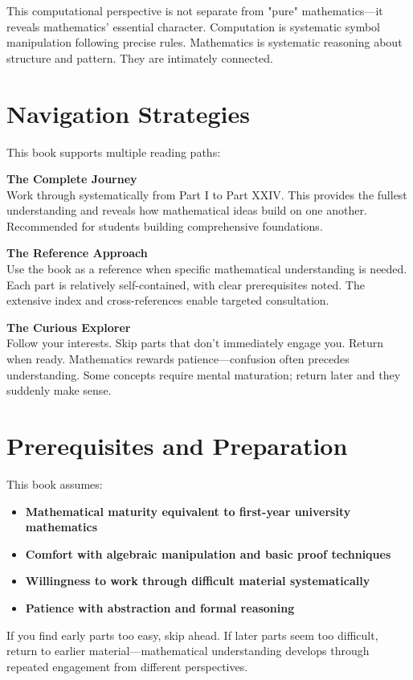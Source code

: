 This computational perspective is not separate from "pure" mathematics—it reveals mathematics' essential character. Computation is systematic symbol manipulation following precise rules. Mathematics is systematic reasoning about structure and pattern. They are intimately connected.

\section*{Navigation Strategies}

This book supports multiple reading paths:

\textbf{The Complete Journey}\\
Work through systematically from Part I to Part XXIV. This provides the fullest understanding and reveals how mathematical ideas build on one another. Recommended for students building comprehensive foundations.

\textbf{The Reference Approach}\\
Use the book as a reference when specific mathematical understanding is needed. Each part is relatively self-contained, with clear prerequisites noted. The extensive index and cross-references enable targeted consultation.

\textbf{The Curious Explorer}\\
Follow your interests. Skip parts that don't immediately engage you. Return when ready. Mathematics rewards patience—confusion often precedes understanding. Some concepts require mental maturation; return later and they suddenly make sense.

\section*{Prerequisites and Preparation}

This book assumes:
\begin{itemize}
    \item \textbf{Mathematical maturity equivalent to first-year university mathematics}
    \item \textbf{Comfort with algebraic manipulation and basic proof techniques}
    \item \textbf{Willingness to work through difficult material systematically}
    \item \textbf{Patience with abstraction and formal reasoning}
\end{itemize}

If you find early parts too easy, skip ahead. If later parts seem too difficult, return to earlier material—mathematical understanding develops through repeated engagement from different perspectives.

